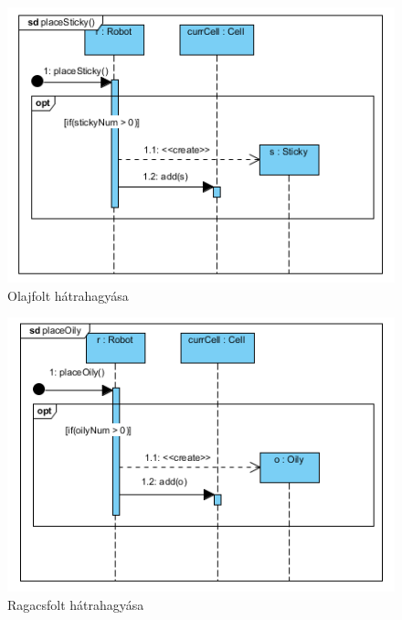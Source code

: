 \begin{figure}[!htbp]
	\begin{center}
		\includegraphics[width=166mm, center]{./vegleges_statikus_seq/placesticky.png}
		\caption{Olajfolt hátrahagyása}
	\end{center}
\end{figure}

\begin{figure}[!htbp]
	\begin{center}
		\includegraphics[width=166mm, center]{./vegleges_statikus_seq/placeoily.png}
		\caption{Ragacsfolt hátrahagyása}
	\end{center}
\end{figure}

\clearpage

